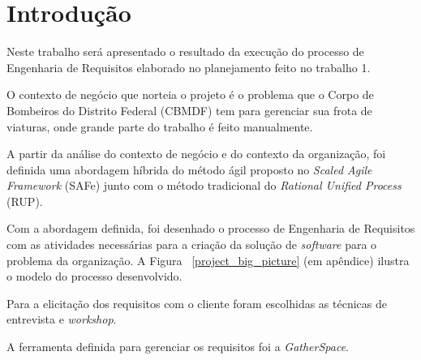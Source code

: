 \chapter[Introdução]{Introdução}
  
  
  Neste trabalho será apresentado o resultado da execução do processo de Engenharia de Requisitos elaborado no
  planejamento feito no trabalho 1.
  
  O contexto de negócio que norteia o projeto é o problema que o Corpo de Bombeiros do Distrito Federal (CBMDF)
  tem para gerenciar sua frota de viaturas, onde grande parte do trabalho é feito manualmente.
  
  A partir da análise do contexto de negócio e do contexto da organização, foi definida uma abordagem híbrida do método
  ágil proposto no \textit{Scaled Agile Framework} (SAFe) junto com o método tradicional do \textit{Rational Unified Process} (RUP).
  
  Com a abordagem definida, foi desenhado o processo de Engenharia de Requisitos com as atividades necessárias para a criação da
  solução de \textit{software} para o problema da organização. A Figura ~\ref{project_big_picture} (em apêndice) ilustra o modelo do
  processo desenvolvido.
  
  Para a elicitação dos requisitos com o cliente foram escolhidas as técnicas de entrevista e \textit{workshop}.
  
  A ferramenta definida para gerenciar os requisitos foi a \textit{GatherSpace}.
  
  \vfill
  
  